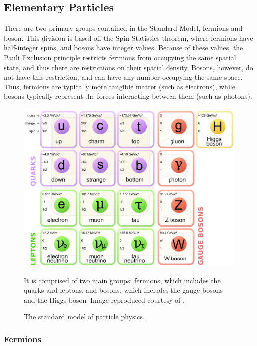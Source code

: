 \subsection{Elementary Particles}

There are two primary groups contained in the Standard Model, fermions and boson. 
This division is based off the Spin Statistics theorem, where fermions have half-integer spins, and bosons have integer values.
Because of these values, the Pauli Exclusion principle restricts fermions from occupying the same spatial state, and thus there are restrictions on their spatial density.
Bosons, however, do not have this restriction, and can have any number occupying the same space.
Thus, fermions are typically more tangible matter (such as electrons), while bosons typically represent the forces interacting between them (such as photons).


\begin{figure}[H]
\centering
\includegraphics[scale=0.30]{figures/images/standard_model.png}
\caption{The standard model of particle physics.}
{It is comprised of two main groups: fermions, which includes the quarks and leptons, and bosons, which includes the gauge bosons and the Higgs boson. Image reproduced courtesy of \cite{ref:Wikimedia:2006}. }
\label{fig:standard_model}
\end{figure}


\subsubsection{Fermions}
\label{sssec:fermions}

